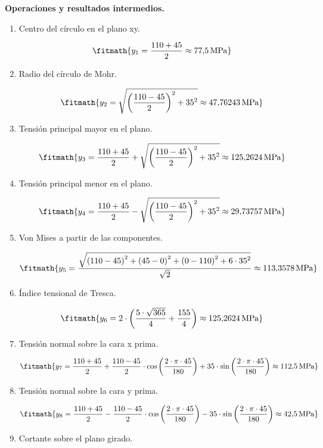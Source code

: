 \noindent\textbf{Operaciones y resultados intermedios.}

\begin{enumerate}

\item Centro del círculo en el plano xy.

\[\fitmath{y_{1}=\frac{110+45}{2}\approx 77{,}5\,\mathrm{MPa}}\]

\item Radio del círculo de Mohr.

\[\fitmath{y_{2}=\sqrt{{\left(\frac{110-45}{2}\right)}^{2}+{35}^{2}}\approx 47{,}76243\,\mathrm{MPa}}\]

\item Tensión principal mayor en el plano.

\[\fitmath{y_{3}=\frac{110+45}{2}+\sqrt{{\left(\frac{110-45}{2}\right)}^{2}+{35}^{2}}\approx 125{,}2624\,\mathrm{MPa}}\]

\item Tensión principal menor en el plano.

\[\fitmath{y_{4}=\frac{110+45}{2}-\sqrt{{\left(\frac{110-45}{2}\right)}^{2}+{35}^{2}}\approx 29{,}73757\,\mathrm{MPa}}\]

\item Von Mises a partir de las componentes.

\[\fitmath{y_{5}=\frac{\sqrt{{\left(110-45\right)}^{2}+{\left(45-0\right)}^{2}+{\left(0-110\right)}^{2}+6\cdot {35}^{2}}}{\sqrt{2}}\approx 113{,}3578\,\mathrm{MPa}}\]

\item Índice tensional de Tresca.

\[\fitmath{y_{6}=2\cdot \left(\frac{5\cdot \sqrt{365}}{4}+\frac{155}{4}\right)\approx 125{,}2624\,\mathrm{MPa}}\]

\item Tensión normal sobre la cara x prima.

\[\fitmath{y_{7}=\frac{110+45}{2}+\frac{110-45}{2}\cdot \cos\left(\frac{2\cdot \pi\cdot 45}{180}\right)+35\cdot \sin\left(\frac{2\cdot \pi\cdot 45}{180}\right)\approx 112{,}5\,\mathrm{MPa}}\]

\item Tensión normal sobre la cara y prima.

\[\fitmath{y_{8}=\frac{110+45}{2}-\frac{110-45}{2}\cdot \cos\left(\frac{2\cdot \pi\cdot 45}{180}\right)-35\cdot \sin\left(\frac{2\cdot \pi\cdot 45}{180}\right)\approx 42{,}5\,\mathrm{MPa}}\]

\item Cortante sobre el plano girado.


\end{enumerate}
